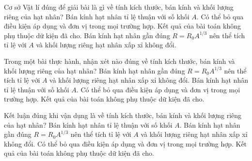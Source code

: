 \begin{ex}
Cơ sở Vật lí đúng để giải bài là gì về tính kích thước, bán kính và khối lượng riêng của hạt nhân?
\choice
{Bán kính hạt nhân tỉ lệ thuận với số khối $A$.}
{Có thể bỏ qua điều kiện áp dụng và đơn vị trong mọi trường hợp.}
{Kết quả của bài toán không phụ thuộc dữ kiện đã cho.}
{\True Bán kính hạt nhân gần đúng $R=R_0A^{1/3}$ nên thể tích tỉ lệ với $A$ và khối lượng riêng hạt nhân xấp xỉ không đổi.}
\end{ex}

\begin{ex}
Trong một bài thực hành, nhận xét nào đúng về tính kích thước, bán kính và khối lượng riêng của hạt nhân?
\choice
{\True Bán kính hạt nhân gần đúng $R=R_0A^{1/3}$ nên thể tích tỉ lệ với $A$ và khối lượng riêng hạt nhân xấp xỉ không đổi.}
{Bán kính hạt nhân tỉ lệ thuận với số khối $A$.}
{Có thể bỏ qua điều kiện áp dụng và đơn vị trong mọi trường hợp.}
{Kết quả của bài toán không phụ thuộc dữ kiện đã cho.}
\end{ex}

\begin{ex}
Kết luận đúng khi vận dụng là về tính kích thước, bán kính và khối lượng riêng của hạt nhân?
\choice
{Bán kính hạt nhân tỉ lệ thuận với số khối $A$.}
{\True Bán kính hạt nhân gần đúng $R=R_0A^{1/3}$ nên thể tích tỉ lệ với $A$ và khối lượng riêng hạt nhân xấp xỉ không đổi.}
{Có thể bỏ qua điều kiện áp dụng và đơn vị trong mọi trường hợp.}
{Kết quả của bài toán không phụ thuộc dữ kiện đã cho.}
\end{ex}

